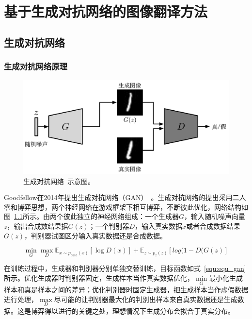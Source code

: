 \chapter{基于生成对抗网络的图像翻译方法}
\section{生成对抗网络}
\subsection{生成对抗网络原理}
\begin{figure}[ht]
    \centering
	\includegraphics[width=\textwidth]{figures/gan.pdf}
	\caption{生成对抗网络~\cite{goodfellow2014generative}示意图。}
	\label{fig:pic_gan}
\end{figure}

Goodfellow在2014年提出生成对抗网络（GAN）~\cite{goodfellow2014generative}。生成对抗网络的提出采用二人零和博弈思想，两个神经网络在游戏框架下相互博弈，不断彼此优化，网络结构如图~\ref{fig:pic_gan}所示。由两个彼此独立的神经网络组成：一个生成器$G$，输入随机噪声向量$z$，输出合成数结果据$G(z)$；一个判别器$D$，输入真实数据$x$或者合成数据结果$G(z)$，判别器试图区分输入真实数据还是合成数据。

\begin{equation}
\label{equ:equ_gan}
\mathop{min} \limits_{G} \mathop{max} \limits_{D} \mathbb{E}_{x \sim p_{data}(x)}[\log D(x)] + \mathbb{E}_{z \sim p_{z}(z)}[log(1-D(G(z)]
\end{equation}

在训练过程中，生成器和判别器分别单独交替训练，目标函数如式~\ref{equ:equ_gan}所示。优化生成器时判别器固定，生成样本当作真实数据优化，$\min \limits_{G}$最小化生成样本和真是样本之间的差异；优化判别器时固定生成器，把生成样本当作虚假数据进行处理，$\max \limits_{D}$尽可能的让判别器最大化的判别出样本来自真实数据还是生成数据。这是博弈得以进行的关键之处，理想情况下生成分布会拟合于真实分布。


